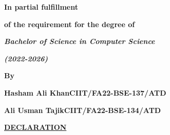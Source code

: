 \documentclass[12pt,a4paper]{article}
\begin{document}
\vspace{5pt}

\vspace{5pt}

{\centering\fontsize{14}{18.2}\selectfont \textbf{In partial fulfillment}\par}


{\centering\fontsize{14}{18.2}\selectfont \textbf{of the requirement for the degree of}\par}


\vspace{5pt}

\vspace{5pt}

\vspace{5pt}

{\centering\fontsize{14}{18.2}\selectfont \textbf{\textit{Bachelor of Science in Computer Science}}\par}


{\centering\fontsize{14}{18.2}\selectfont \textbf{\textit{ (2022-2026)}}\par}


\vspace{5pt}

{\centering\fontsize{14}{18.2}\selectfont \textbf{By}\par}


\vspace{5pt}

\vspace{5pt}

{\centering\fontsize{14}{18.2}\selectfont \textbf{Hasham Ali Khan\hspace*{1.75em}CIIT/FA22-BSE-137/ATD}\par}


{\centering\fontsize{14}{18.2}\selectfont \textbf{Ali Usman Tajik\hspace*{2.25em}CIIT/FA22-BSE-134/ATD}\par}


\vspace{5pt}

\vspace{5pt}

\vspace{5pt}

\vspace{5pt}

\vspace{5pt}

\clearpage

{\centering\bfseries\underline{DECLARATION}\par}
\vspace{8pt}
\end{document}
